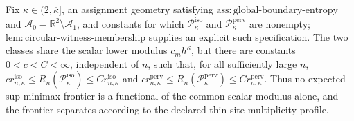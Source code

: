 Fix \(\kappa\in(2,\overline\kappa]\), an assignment geometry satisfying \(\mathrm{ass:global\text{-}boundary\text{-}entropy}\) and \(\mathcal A_0=\mathbb R^2\setminus\mathcal A_1\), and constants for which \(\mathcal P_{\kappa}^{\mathrm{iso}}\) and \(\mathcal P_{\kappa}^{\mathrm{perv}}\) are nonempty; \(\mathrm{lem:circular\text{-}witness\text{-}membership}\) supplies an explicit such specification. The two classes share the scalar lower modulus \(c_mh^{\kappa}\), but there are constants \(0<c<C<\infty\), independent of \(n\), such that, for all sufficiently large \(n\), \(c r_{n,\kappa}^{\mathrm{iso}}\le R_n(\mathcal P_{\kappa}^{\mathrm{iso}})\le C r_{n,\kappa}^{\mathrm{iso}}\) and \(c r_{n,\kappa}^{\mathrm{perv}}\le R_n(\mathcal P_{\kappa}^{\mathrm{perv}})\le C r_{n,\kappa}^{\mathrm{perv}}\). Thus no expected-sup minimax frontier is a functional of the common scalar modulus alone, and the frontier separates according to the declared thin-site multiplicity profile.